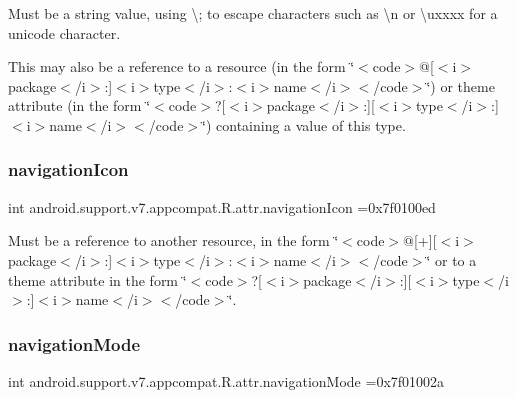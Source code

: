 Must be a string value, using \textquotesingle{}\textbackslash{};\textquotesingle{} to escape characters such as \textquotesingle{}\textbackslash{}n\textquotesingle{} or \textquotesingle{}\textbackslash{}uxxxx\textquotesingle{} for a unicode character. 

This may also be a reference to a resource (in the form \char`\"{}$<$code$>$@\mbox{[}$<$i$>$package$<$/i$>$\+:\mbox{]}$<$i$>$type$<$/i$>$\+:$<$i$>$name$<$/i$>$$<$/code$>$\char`\"{}) or theme attribute (in the form \char`\"{}$<$code$>$?\mbox{[}$<$i$>$package$<$/i$>$\+:\mbox{]}\mbox{[}$<$i$>$type$<$/i$>$\+:\mbox{]}$<$i$>$name$<$/i$>$$<$/code$>$\char`\"{}) containing a value of this type. \mbox{\label{classandroid_1_1support_1_1v7_1_1appcompat_1_1R_1_1attr_a1f9dac21fa90b5d11e9f0e54b22a47ec}} 
\subsubsection{\texorpdfstring{navigation\+Icon}{navigationIcon}}
{\footnotesize\ttfamily int android.\+support.\+v7.\+appcompat.\+R.\+attr.\+navigation\+Icon =0x7f0100ed\hspace{0.3cm}{\ttfamily [static]}}

Must be a reference to another resource, in the form \char`\"{}$<$code$>$@\mbox{[}+\mbox{]}\mbox{[}$<$i$>$package$<$/i$>$\+:\mbox{]}$<$i$>$type$<$/i$>$\+:$<$i$>$name$<$/i$>$$<$/code$>$\char`\"{} or to a theme attribute in the form \char`\"{}$<$code$>$?\mbox{[}$<$i$>$package$<$/i$>$\+:\mbox{]}\mbox{[}$<$i$>$type$<$/i$>$\+:\mbox{]}$<$i$>$name$<$/i$>$$<$/code$>$\char`\"{}. \mbox{\label{classandroid_1_1support_1_1v7_1_1appcompat_1_1R_1_1attr_a15549c3d8819d1bbfe5aab0c51cb2b65}} 
\subsubsection{\texorpdfstring{navigation\+Mode}{navigationMode}}
{\footnotesize\ttfamily int android.\+support.\+v7.\+appcompat.\+R.\+attr.\+navigation\+Mode =0x7f01002a\hspace{0.3cm}{\ttfamily [static]}}

